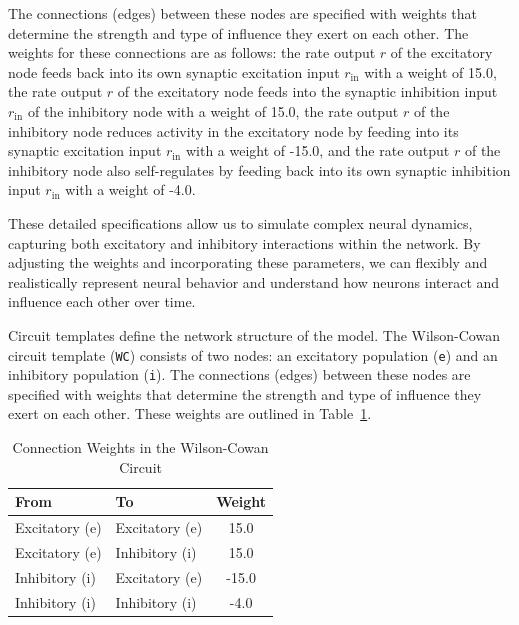 \documentclass[12pt]{article}
\begin{document}
The connections (edges) between these nodes are specified with weights that determine the strength and type of influence they exert on each other. The weights for these connections are as follows: the rate output \( r \) of the excitatory node feeds back into its own synaptic excitation input \( r_{\mathrm{in}} \) with a weight of 15.0, the rate output \( r \) of the excitatory node feeds into the synaptic inhibition input \( r_{\mathrm{in}} \) of the inhibitory node with a weight of 15.0, the rate output \( r \) of the inhibitory node reduces activity in the excitatory node by feeding into its synaptic excitation input \( r_{\mathrm{in}} \) with a weight of -15.0, and the rate output \( r \) of the inhibitory node also self-regulates by feeding back into its own synaptic inhibition input \( r_{\mathrm{in}} \) with a weight of -4.0.

These detailed specifications allow us to simulate complex neural dynamics, capturing both excitatory and inhibitory interactions within the network. By adjusting the weights and incorporating these parameters, we can flexibly and realistically represent neural behavior and understand how neurons interact and influence each other over time.


Circuit templates define the network structure of the model. The Wilson-Cowan circuit template (\texttt{WC}) consists of two nodes: an excitatory population (\texttt{e}) and an inhibitory population (\texttt{i}). The connections (edges) between these nodes are specified with weights that determine the strength and type of influence they exert on each other. These weights are outlined in Table~\ref{tab:weights}.

\begin{table}[h]
    \centering
    \caption{Connection Weights in the Wilson-Cowan Circuit}
    \label{tab:weights}
    \begin{tabular}{@{}llc@{}}
        \toprule
        \textbf{From} & \textbf{To} & \textbf{Weight} \\ \midrule
        Excitatory (e) & Excitatory (e) & 15.0 \\
        Excitatory (e) & Inhibitory (i) & 15.0 \\
        Inhibitory (i) & Excitatory (e) & -15.0 \\
        Inhibitory (i) & Inhibitory (i) & -4.0 \\ \bottomrule
    \end{tabular}
\end{table}
\end{document}
